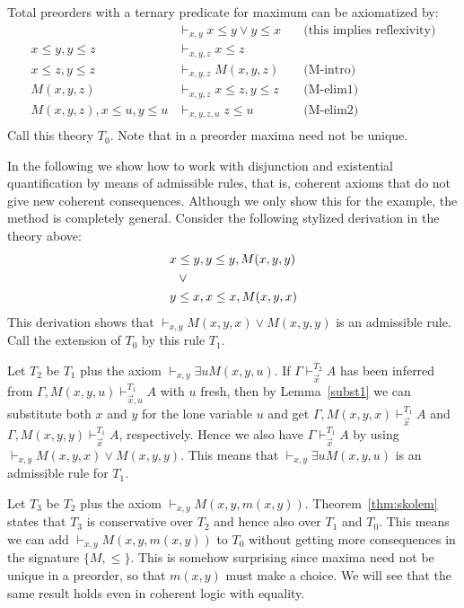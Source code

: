 \documentclass[10pt,a4paper]{article}
\newcommand{\set}[1]{\{#1\}}
\begin{document}
Total preorders with a ternary predicate for maximum can be axiomatized by:
\begin{align*}
                                                 &\vdash_{x,y}           x\leq y \lor y\leq x
&\quad\text{(this implies reflexivity)}\\
x\leq y, y\leq z              &\vdash_{x,y,z}        x\leq z\\
x\leq z, y\leq z                   &\vdash_{x,y,z}           M(x,y,z)
&\quad\text{(M-intro)}\\ 
M(x,y,z)                                   &\vdash_{x,y,z}        x\leq z,  y\leq z
&\quad\text{(M-elim1)}\\
M(x,y,z), x\leq u,  y\leq u      &\vdash_{x,y,z,u}    z\leq u
&\quad\text{(M-elim2)}\\
\end{align*}
Call this theory $T_0$. Note that in a preorder maxima need not be unique.

In the following we show how to work with disjunction and existential
quantification by means of admissible rules, that is, coherent
axioms that do not give new coherent consequences. Although we
only show this for the example, the method is completely general.
Consider the following stylized derivation in the theory above:
\begin{align*}
& x\leq y, y\leq y,M(x,y,y)\\
&{\hphantom w} \lor\\
&y\leq x, x\leq x,M(x,y,x) \\
\end{align*}
This derivation shows that $\vdash_{x,y} M(x,y,x)  \lor M(x,y,y)$ is an
admissible rule. Call the extension of $T_0$ by this rule $T_1$.

Let $T_2$ be $T_1$ plus the axiom $\vdash_{x,y} \exists u M(x,y,u)$.
If $\Gamma \vdash_{\vec{x}}^{T_2} A$ has been inferred from
$\Gamma,M(x,y,u) \vdash_{\vec{x},u}^{T_1} A$ with $u$ fresh,
then by Lemma~\ref{subst1} we can substitute both $x$ and $y$ 
for the lone variable $u$ and get $\Gamma,M(x,y,x) \vdash_{\vec{x}}^{T_1} A$
and $\Gamma,M(x,y,y) \vdash_{\vec{x}}^{T_1} A$, respectively.
Hence we also have $\Gamma \vdash_{\vec{x}}^{T_1} A$
by using $\vdash_{x,y} M(x,y,x)  \lor M(x,y,y)$.
This means that $\vdash_{x,y} \exists u M(x,y,u)$ is an admissible rule
for $T_1$.

Let $T_3$ be $T_2$ plus the axiom $\vdash_{x,y} M(x,y,m(x,y))$. 
Theorem~\ref{thm:skolem} states that  $T_3$ is conservative over
$T_2$ and hence also over $T_1$ and $T_0$. This means we can add
$\vdash_{x,y} M(x,y,m(x,y))$ to $T_0$ without getting more consequences
in the signature $\set{M,{\leq}}$. This is somehow surprising since maxima
need not be unique in a preorder, so that $m(x,y)$ must make a choice.
 We will see that the same result holds even in coherent logic with equality.
\end{document}
